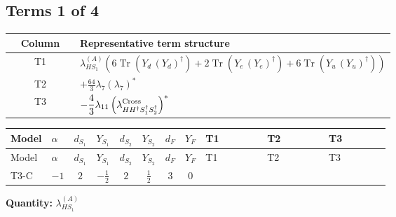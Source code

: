 \documentclass[8pt]{article}
\begin{document}
\begin{landscape}
\subsection*{Terms 1 of 4}
\begin{center}
\begin{tabular}{@{}c >{\raggedright\arraybackslash}p{0.82\linewidth}@{}}
\toprule
Column & Representative term structure \\
\midrule
T1 & \(\displaystyle {\lambda_{HS_1}^{(A)}} (6 \operatorname{Tr}\!\left({Y_d}\,\left({Y_d}\right)^{\dagger}\right)+2 \operatorname{Tr}\!\left({Y_e}\,\left({Y_e}\right)^{\dagger}\right)+6 \operatorname{Tr}\!\left({Y_u}\,\left({Y_u}\right)^{\dagger}\right))\) \\
\midrule
T2 & \(\displaystyle +\frac{64}{3} {\lambda_{7}} \left({\lambda_{7}}\right)^{*}\) \\
\midrule
T3 & \(\displaystyle -\frac{4}{3} {\lambda_{11}} \left({\lambda_{H H^\dagger S_1^\dagger S_2^\dagger}^{\rm Cross}}\right)^{*}\) \\
\midrule
\bottomrule
\end{tabular}
\end{center}
\smallskip
\tiny
\begin{longtable}{@{}llcccccc >{\raggedright\arraybackslash}p{0.21\linewidth} >{\raggedright\arraybackslash}p{0.21\linewidth} >{\raggedright\arraybackslash}p{0.21\linewidth}@{}}
\toprule
Model & $\alpha$ & $d_{S_1}$ & $Y_{S_1}$ & $d_{S_2}$ & $Y_{S_2}$ & $d_F$ & $Y_F$ & T1 & T2 & T3 \\
\midrule
\endfirsthead
\toprule
Model & $\alpha$ & $d_{S_1}$ & $Y_{S_1}$ & $d_{S_2}$ & $Y_{S_2}$ & $d_F$ & $Y_F$ & T1 & T2 & T3 \\
\midrule
\endhead
T3-C & $-1$ & $2$ & $-\frac{1}{2}$ & $2$ & $\frac{1}{2}$ & $3$ & $0$ & \scriptsize\adjustbox{max width=\linewidth}{$\begin{gathered} {\lambda_{HS_1}^{(A)}} (6 \operatorname{Tr}\!\left({Y_d}\,\left({Y_d}\right)^{\dagger}\right)+2 \operatorname{Tr}\!\left({Y_e}\,\left({Y_e}\right)^{\dagger}\right)+6 \operatorname{Tr}\!\left({Y_u}\,\left({Y_u}\right)^{\dagger}\right))\end{gathered}$} & \scriptsize\adjustbox{max width=\linewidth}{$\begin{gathered} +\frac{64}{3} {\lambda_{7}} \left({\lambda_{7}}\right)^{*}\end{gathered}$} & \scriptsize\adjustbox{max width=\linewidth}{$\begin{gathered} -\frac{4}{3} {\lambda_{11}} \left({\lambda_{H H^\dagger S_1^\dagger S_2^\dagger}^{\rm Cross}}\right)^{*}\end{gathered}$} \\
\midrule
\bottomrule
\end{longtable}
\clearpage
\noindent\textbf{Quantity: }$\lambda_{HS_1}^{(A)}$\par\smallskip

\end{landscape}
\end{document}
